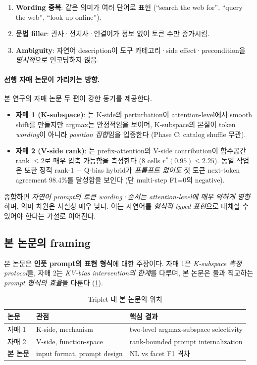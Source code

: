 \documentclass[11pt]{article}
\theoremstyle{plain}
\theoremstyle{definition}
\theoremstyle{remark}
\begin{document}
\begin{enumerate}[leftmargin=*]
\item \textbf{Wording 중복}: 같은 의미가 여러 단어로 표현 (``search the web for'', ``query the web'', ``look up online'').
\item \textbf{문법 filler}: 관사·전치사·연결어가 정보 없이 토큰 수만 증가시킴.
\item \textbf{Ambiguity}: 자연어 description이 도구 카테고리·side effect·precondition을 \emph{명시적}으로 인코딩하지 않음.
\end{enumerate}

\paragraph{선행 자매 논문이 가리키는 방향.}
본 연구의 자매 논문 두 편이 강한 동기를 제공한다.

\begin{itemize}[leftmargin=*]
\item \textbf{자매 1 (K-subspace)}: \citet{sibling2027argmax}는 K-side의 perturbation이 attention-level에서 smooth shift를 만들지만 argmax는 안정적임을 보이며, K-subspace의 본질이 token \emph{wording}이 아니라 \emph{position 집합}임을 입증한다 (Phase C: catalog shuffle 무관).
\item \textbf{자매 2 (V-side rank)}: \citet{sibling2027prompt}는 prefix-attention의 V-side contribution이 함수공간 rank $\le 2$로 매우 압축 가능함을 측정한다 (8 cells $r^*(0.95) \le 2.25$). 동일 작업은 또한 정적 rank-1 + Q-bias hybrid가 \emph{프롬프트 없이도} 첫 토큰 next-token agreement 98.4\%를 달성함을 보인다 (단 multi-step F1=0의 negative).
\end{itemize}

종합하면 \emph{자연어 prompt의 토큰 wording·순서는 attention-level에 매우 약하게 영향}하며, 의미 차원은 사실상 매우 낮다. 이는 자연어를 \emph{형식적 typed 표현}으로 대체할 수 있어야 한다는 가설로 이어진다.

\subsection{본 논문의 framing}
\label{sec:framing}

본 논문은 \textbf{인풋 prompt의 표현 형식}에 대한 주장이다. 자매 1은 \emph{K-subspace 측정 protocol}을, 자매 2는 \emph{KV-bias intervention의 한계}를 다루며, 본 논문은 둘과 직교하는 \emph{prompt 형식의 효율}을 다룬다 (\cref{tab:position}).

\begin{table}[h]
\centering
\caption{Triplet 내 본 논문의 위치}
\label{tab:position}
\small
\begin{tabular}{lll}
\toprule
논문 & 관점 & 핵심 결과 \\
\midrule
자매 1 \citep{sibling2027argmax} & K-side, mechanism & two-level argmax-subspace selectivity \\
자매 2 \citep{sibling2027prompt} & V-side, function-space & rank-bounded prompt internalization \\
\textbf{본 논문} & input format, prompt design & NL vs facet F1 격차 \\
\bottomrule
\end{tabular}
\end{table}
\end{document}
